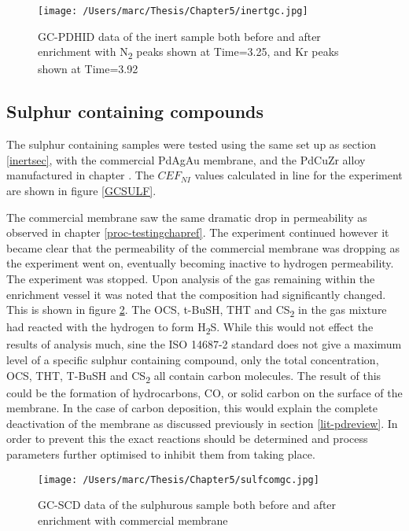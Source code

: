 \begin{figure}[H]
    \centering
    \texttt{[image: /Users/marc/Thesis/Chapter5/inertgc.jpg]}
    \caption{GC-PDHID data of the inert sample both before and after enrichment with N\textsubscript{2} peaks shown at Time=3.25, and Kr peaks shown at Time=3.92}
    \label{GCinert}
\end{figure}

\subsection{Sulphur containing compounds}
The sulphur containing samples were tested using the same set up as section \ref{inertsec}, with the commercial PdAgAu membrane, and the PdCuZr alloy manufactured in chapter \label{proc-testingchapref}. The $CEF_{NI}$ values calculated in line for the experiment are shown in figure \ref{GCSULF}.

The commercial membrane saw the same dramatic drop in permeability as observed in chapter \ref{proc-testingchapref}. The experiment continued however it became clear that the permeability of the commercial membrane was dropping as the experiment went on, eventually becoming inactive to hydrogen permeability. The experiment was stopped. Upon analysis of the gas remaining within the enrichment vessel it was noted that the composition had significantly changed. This is shown in figure \ref{GCSULFCOMM}. The OCS, t-BuSH, THT and CS\textsubscript{2} in the gas mixture had reacted with the hydrogen to form H\textsubscript{2}S. While this would not effect the results of analysis much, sine the ISO 14687-2 standard does not give a maximum level of a specific sulphur containing compound, only the total concentration, OCS, THT, T-BuSH and CS\textsubscript{2} all contain carbon molecules. The result of this could be the formation of hydrocarbons, CO, or solid carbon on the surface of the membrane. In the case of carbon deposition, this would explain the complete deactivation of the membrane as discussed previously in section \ref{lit-pdreview}. In order to prevent this the exact reactions should be determined and process parameters further optimised to inhibit them from taking place. 

\begin{figure}[H]
    \centering
    \texttt{[image: /Users/marc/Thesis/Chapter5/sulfcomgc.jpg]}
    \caption{GC-SCD data of the sulphurous sample both before and after enrichment with commercial membrane}
    \label{GCSULFCOMM}
\end{figure}

